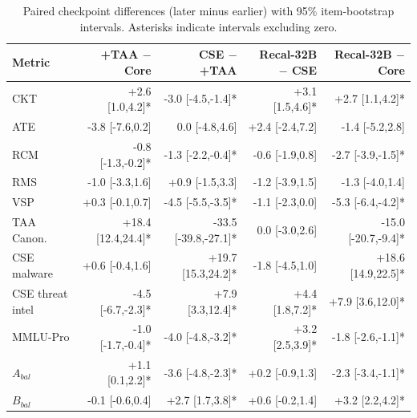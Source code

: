 \documentclass[conference]{IEEEtran}
\begin{document}
\begin{table}[t]
\caption{Paired checkpoint differences (later minus earlier) with 95\% item-bootstrap intervals. Asterisks indicate intervals excluding zero.}
\label{tab:transitions}
\centering
\footnotesize
\setlength{\tabcolsep}{2.5pt}
\begin{tabular}{@{}lrrrr@{}}
\toprule
Metric & +TAA $-$ Core & CSE $-$ +TAA & Recal-32B $-$ CSE & Recal-32B $-$ Core \\
\midrule
CKT & +2.6 [1.0,4.2]* & -3.0 [-4.5,-1.4]* & +3.1 [1.5,4.6]* & +2.7 [1.1,4.2]* \\
ATE & -3.8 [-7.6,0.2] & 0.0 [-4.8,4.6] & +2.4 [-2.4,7.2] & -1.4 [-5.2,2.8] \\
RCM & -0.8 [-1.3,-0.2]* & -1.3 [-2.2,-0.4]* & -0.6 [-1.9,0.8] & -2.7 [-3.9,-1.5]* \\
RMS & -1.0 [-3.3,1.6] & +0.9 [-1.5,3.3] & -1.2 [-3.9,1.5] & -1.3 [-4.0,1.4] \\
VSP & +0.3 [-0.1,0.7] & -4.5 [-5.5,-3.5]* & -1.1 [-2.3,0.0] & -5.3 [-6.4,-4.2]* \\
TAA Canon. & +18.4 [12.4,24.4]* & -33.5 [-39.8,-27.1]* & 0.0 [-3.0,2.6] & -15.0 [-20.7,-9.4]* \\
CSE malware & +0.6 [-0.4,1.6] & +19.7 [15.3,24.2]* & -1.8 [-4.5,1.0] & +18.6 [14.9,22.5]* \\
CSE threat intel & -4.5 [-6.7,-2.3]* & +7.9 [3.3,12.4]* & +4.4 [1.8,7.2]* & +7.9 [3.6,12.0]* \\
MMLU-Pro & -1.0 [-1.7,-0.4]* & -4.0 [-4.8,-3.2]* & +3.2 [2.5,3.9]* & -1.8 [-2.6,-1.1]* \\
$A_{bal}$ & +1.1 [0.1,2.2]* & -3.6 [-4.8,-2.3]* & +0.2 [-0.9,1.3] & -2.3 [-3.4,-1.1]* \\
$B_{bal}$ & -0.1 [-0.6,0.4] & +2.7 [1.7,3.8]* & +0.6 [-0.2,1.4] & +3.2 [2.2,4.2]* \\
\bottomrule
\end{tabular}
\end{table}
\end{document}
